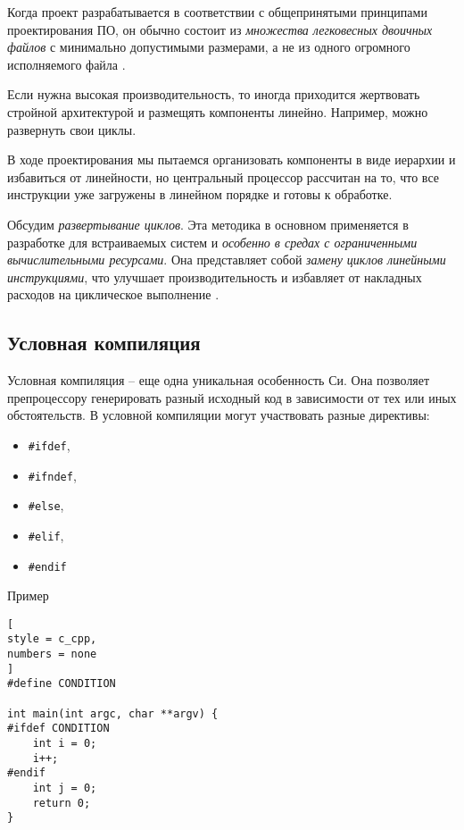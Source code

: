 \documentclass[%
	11pt,
	a4paper,
	utf8,
		]{article}
\begin{document}
Когда проект разрабатывается в соответствии с общепринятыми принципами проектирования ПО, он обычно состоит из \emph{множества легковесных двоичных файлов} с минимально допустимыми размерами, а не из одного огромного исполняемого файла \cite[]{amini-extreme-c:2022}.

Если нужна высокая производительность, то иногда приходится жертвовать стройной архитектурой и размещять компоненты линейно. Например, можно развернуть свои циклы.

В ходе проектирования мы пытаемся организовать компоненты в виде иерархии и избавиться от линейности, но центральный процессор рассчитан на то, что все инструкции уже загружены в линейном порядке и готовы к обработке. 

Обсудим \emph{развертывание циклов}. Эта методика в основном применяется в разработке для встраиваемых систем и \emph{особенно в средах с ограниченными вычислительными ресурсами}. Она представляет собой \emph{замену циклов линейными инструкциями}, что улучшает производительность и избавляет от накладных расходов на циклическое выполнение \cite[]{amini-extreme-c:2022}.

\subsection{Условная компиляция}

Условная компиляция -- еще одна уникальная особенность Си. Она позволяет препроцессору генерировать разный исходный код в зависимости от тех или иных обстоятельств. В условной компиляции могут участвовать разные директивы:
\begin{itemize}
	\item \verb|#ifdef|,
	
	\item \verb|#ifndef|,
	
	\item \verb|#else|,
	
	\item \verb|#elif|,
	
	\item \verb|#endif|
\end{itemize}

Пример
\begin{lstlisting}[
style = c_cpp,
numbers = none
]
#define CONDITION

int main(int argc, char **argv) {
#ifdef CONDITION
    int i = 0;
    i++;
#endif
    int j = 0;
    return 0;
}
\end{lstlisting}
\end{document}
